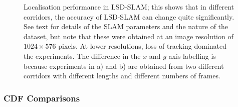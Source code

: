 \begin{figure}
	\centering
	\quad
	\caption{Localisation performance in LSD-SLAM; this shows that in different corridors, the accuracy of LSD-SLAM can change quite significantly. See text for details of the SLAM parameters and the nature of the dataset, but note that these were obtained at an image resolution of $1024 \times 576$ pixels. At lower resolutions, loss of tracking dominated the experiments. The difference in the $x$ and $y$ axis labelling is because experiments in a) and b) are obtained from two different corridors with different lengths and different numbers of frames.}
	\label{fig:slamperf}
\end{figure}


\subsubsection{CDF Comparisons}

